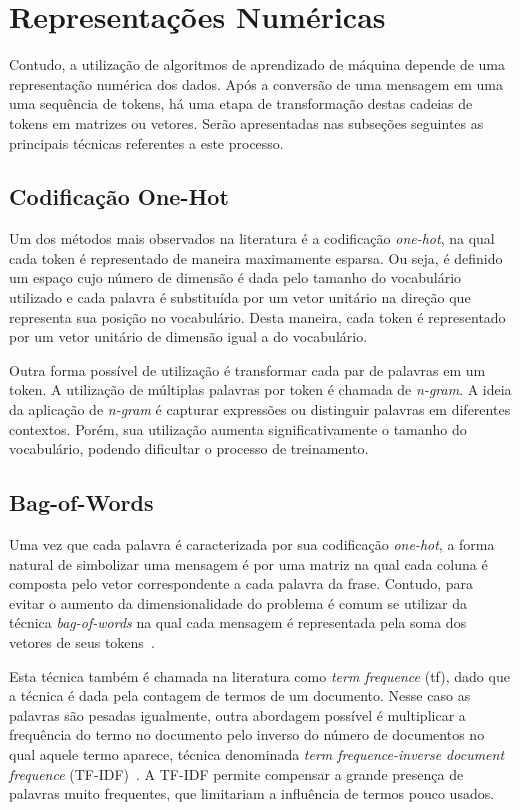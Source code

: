 \section{Representações Numéricas}

Contudo, a utilização de algoritmos de aprendizado de máquina depende de uma representação numérica dos dados.
Após a conversão de uma mensagem em uma uma sequência de tokens, há uma etapa de transformação destas cadeias
de tokens em matrizes ou vetores.
Serão apresentadas nas subseções seguintes as principais técnicas referentes a este processo.

\subsection{Codificação One-Hot}

Um dos métodos mais observados na literatura é a codificação \textit{one-hot}, na qual cada token é representado de
maneira maximamente esparsa.
Ou seja, é definido um espaço cujo número de dimensão é dada pelo tamanho do vocabulário utilizado e cada palavra é
substituída por um vetor unitário na direção que representa sua posição no vocabulário.
Desta maneira, cada token é representado por um vetor unitário de dimensão igual a do vocabulário.

Outra forma possível de utilização é transformar cada par de palavras em um token.
A utilização de múltiplas palavras por token é chamada de \textit{n-gram}.
A ideia da aplicação de \textit{n-gram} é capturar expressões ou distinguir palavras em diferentes contextos.
Porém, sua utilização aumenta significativamente o tamanho do vocabulário, podendo dificultar o processo de treinamento.

\subsection{Bag-of-Words}

Uma vez que cada palavra é caracterizada por sua codificação \textit{one-hot}, a forma natural de simbolizar uma mensagem
é por uma matriz na qual cada coluna é composta pelo vetor correspondente a cada palavra da frase.
Contudo, para evitar o aumento da dimensionalidade do problema é comum se utilizar da técnica \textit{bag-of-words} na
qual cada mensagem é representada pela soma dos vetores de seus tokens~\cite{schutze08}.

Esta técnica também é chamada na literatura como \textit{term frequence} (tf), dado que a técnica é dada pela contagem
de termos de um documento.
Nesse caso as palavras são pesadas igualmente, outra abordagem possível é multiplicar a frequência do termo no documento
pelo inverso do número de documentos no qual aquele termo aparece, técnica denominada \textit{term frequence-inverse
document frequence} (TF-IDF)~\cite{salton88}.
A TF-IDF permite compensar a grande presença de palavras muito frequentes, que limitariam a influência de termos pouco
usados.


